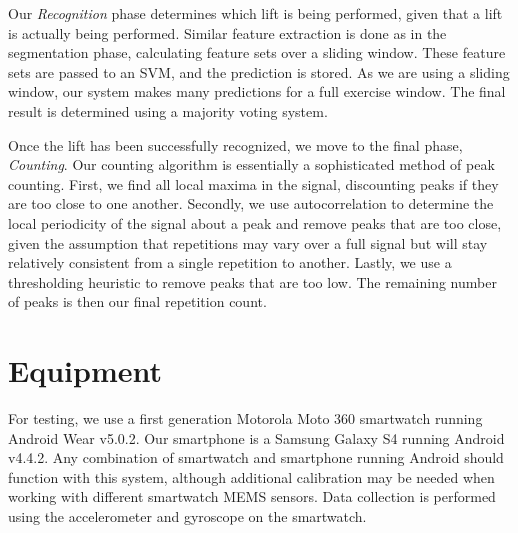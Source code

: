 Our \textit{Recognition} phase determines which lift is being performed, given that a lift is actually being performed. Similar feature extraction is done as in the segmentation phase, calculating feature sets over a sliding window. These feature sets are passed to an SVM, and the prediction is stored. As we are using a sliding window, our system makes many predictions for a full exercise window. The final result is determined using a majority voting system.

Once the lift has been successfully recognized, we move to the final phase, \textit{Counting}. Our counting algorithm is essentially a sophisticated method of peak counting. First, we find all local maxima in the signal, discounting peaks if they are too close to one another. Secondly, we use autocorrelation to determine the local periodicity of the signal about a peak and remove peaks that are too close, given the assumption that repetitions may vary over a full signal but will stay relatively consistent from a single repetition to another. Lastly, we use a thresholding heuristic to remove peaks that are too low. The remaining number of peaks is then our final repetition count. 

\section{Equipment}

For testing, we use a first generation Motorola Moto 360 smartwatch running Android Wear v5.0.2. Our smartphone is a Samsung Galaxy S4 running Android v4.4.2. Any combination of smartwatch and smartphone running Android should function with this system, although additional calibration may be needed when working with different smartwatch MEMS sensors. Data collection is performed using the accelerometer and gyroscope on the smartwatch.